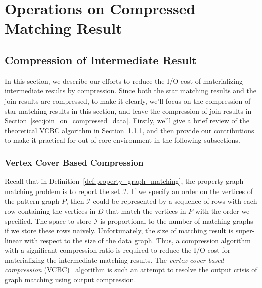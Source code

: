 \section{Operations on Compressed Matching Result}
\subsection{Compression of Intermediate Result}\label{sec:compression_of_intermediate_result}
In this section, we describe our efforts to reduce the I/O cost of materializing intermediate results by compression.
Since both the star matching results and the join results are compressed,
to make it clearly, we'll focus on the compression of star matching results in this section,
and leave the compression of join results in Section~\ref{sec:join_on_compressed_data}.
Firstly, we'll give a brief review of the theoretical VCBC algorithm in Section~\ref{sec:vcbc},
and then provide our contributions to make it practical for out-of-core environment in the following subsections.
\subsubsection{Vertex Cover Based Compression}\label{sec:vcbc}
Recall that in Definition~\ref{def:property_graph_matching},
the property graph matching problem is to report the set $\mathcal{I}$.
If we specify an order on the vertices of the pattern graph $P$,
then $\mathcal{I}$ could be represented by a sequence of rows with each row containing the vertices in $D$ that match the vertices in $P$ with the order we specified.
The space to store $\mathcal{I}$ is proportional to the number of matching graphs if we store these rows naively.
Unfortunately, the size of matching result is super-linear with respect to the size of the data graph.
Thus, a compression algorithm with a significant compression ratio is required to reduce the I/O cost for materializing the intermediate matching results.
The \emph{vertex cover based compression} (VCBC)~\cite{DBLP:journals/pvldb/QiaoZC17} algorithm is such an attempt to resolve the output crisis of graph matching using output compression.

